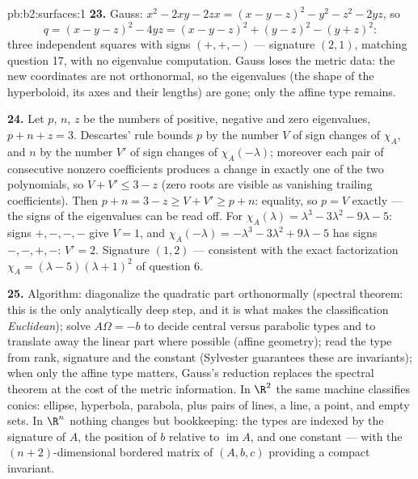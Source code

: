 \begin{solution}{pb:b2:surfaces:1}
\textbf{23.} Gauss: $x^2 - 2xy - 2zx = (x - y - z)^2 - y^2 -
z^2 - 2yz$, so
\[
q = (x - y - z)^2 - 4yz = (x - y - z)^2 + (y - z)^2 - (y +
z)^2 :
\]
three independent squares with signs $(+, +, -)$ --- signature
$(2, 1)$, matching question 17, with no eigenvalue
computation. Gauss loses the metric data: the new coordinates
are not orthonormal, so the eigenvalues (the shape of the
hyperboloid, its axes and their lengths) are gone; only the
affine type remains.

\textbf{24.} Let $p$, $n$, $z$ be the numbers of positive,
negative and zero eigenvalues, $p + n + z = 3$. Descartes'
rule bounds $p$ by the number $V$ of sign changes of
$\chi_A$, and $n$ by the number $V'$ of sign changes of
$\chi_A(-\lambda)$; moreover each pair of consecutive nonzero
coefficients produces a change in exactly one of the two
polynomials, so $V + V' \leq 3 - z$ (zero roots are visible
as vanishing trailing coefficients). Then $p + n = 3 - z \geq
V + V' \geq p + n$: equality, so $p = V$ exactly --- the
signs of the eigenvalues can be read off. For $\chi_A(\lambda)
= \lambda^3 - 3\lambda^2 - 9\lambda - 5$: signs $+,-,-,-$
give $V = 1$, and $\chi_A(-\lambda) = -\lambda^3 - 3\lambda^2
+ 9\lambda - 5$ has signs $-,-,+,-$: $V' = 2$. Signature $(1,
2)$ --- consistent with the exact factorization $\chi_A =
(\lambda - 5)(\lambda + 1)^2$ of question 6.

\textbf{25.} Algorithm: diagonalize the quadratic part
orthonormally (spectral theorem: this is the only
analytically deep step, and it is what makes the
classification \emph{Euclidean}); solve $A\Omega = -b$ to
decide central versus parabolic types and to translate away
the linear part where possible (affine geometry); read the
type from rank, signature and the constant (Sylvester
guarantees these are invariants); when only the affine type
matters, Gauss's reduction replaces the spectral theorem at
the cost of the metric information. In $\R^2$ the same
machine classifies conics: ellipse, hyperbola, parabola, plus
pairs of lines, a line, a point, and empty sets. In $\R^n$
nothing changes but bookkeeping: the types are indexed by the
signature of $A$, the position of $b$ relative to
$\operatorname{im}A$, and one constant --- with the
$(n{+}2)$-dimensional bordered matrix of $(A, b, c)$
providing a compact invariant.
\end{solution}
